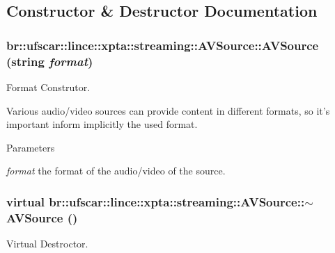 \subsection{Constructor \& Destructor Documentation}
\hypertarget{classbr_1_1ufscar_1_1lince_1_1xpta_1_1streaming_1_1AVSource_ac07cc6f087efe58f2b723910c0718db4}{
\subsubsection[{AVSource}]{\setlength{\rightskip}{0pt plus 5cm}br::ufscar::lince::xpta::streaming::AVSource::AVSource (string {\em format})}}
\label{classbr_1_1ufscar_1_1lince_1_1xpta_1_1streaming_1_1AVSource_ac07cc6f087efe58f2b723910c0718db4}


Format Construtor. 

Various audio/video sources can provide content in different formats, so it's important inform implicitly the used format. 
\begin{DoxyParams}{Parameters}
\item[{\em format}]the format of the audio/video of the source. \end{DoxyParams}
\hypertarget{classbr_1_1ufscar_1_1lince_1_1xpta_1_1streaming_1_1AVSource_a1cd42bb6d2f38b872963320ed457a034}{
\subsubsection[{$\sim$AVSource}]{\setlength{\rightskip}{0pt plus 5cm}virtual br::ufscar::lince::xpta::streaming::AVSource::$\sim$AVSource ()}}
\label{classbr_1_1ufscar_1_1lince_1_1xpta_1_1streaming_1_1AVSource_a1cd42bb6d2f38b872963320ed457a034}


Virtual Destroctor. 



